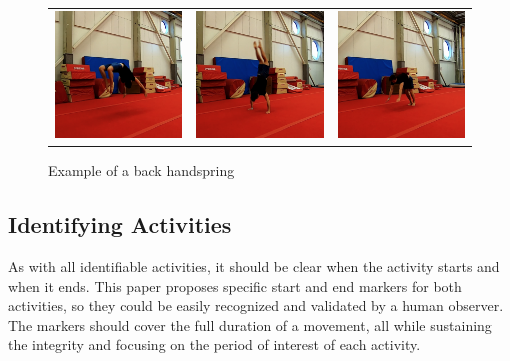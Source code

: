 \begin{figure}
\begin{tabular}{ccc}
\includegraphics[width=5cm]{images/data-acquisition/example-flack-part-4}&
\includegraphics[width=5cm]{images/data-acquisition/example-flack-part-5}&
\includegraphics[width=5cm]{images/data-acquisition/example-flack-part-6}\\
\end{tabular}
    \caption{Example of a back handspring}
    \label{example-of-back-handspring}
\end{figure}

\subsection{Identifying Activities}

As with all identifiable activities, it should be clear when the activity starts and when it ends. This paper proposes specific start and end markers for both activities, so they could be easily recognized and validated by a human observer. The markers should cover the full duration of a movement, all while sustaining the integrity and focusing on the period of interest of each activity.


